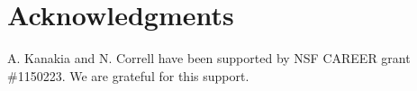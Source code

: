 \documentclass[smallextended]{svjour3}       %
\begin{document}
\section*{Acknowledgments}
A. Kanakia and N. Correll have been supported by NSF CAREER grant \#1150223. We are grateful for this support.






\end{document}
